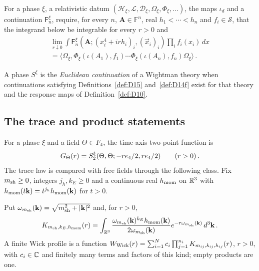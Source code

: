 \begin{definition}\label{def:D14f}
For a phase $\xi$, a relativistic datum $(\mathcal H_\xi,\mathcal L,\mathcal D_\xi,\Omega_\xi,\Phi_\xi,\ldots)$, the maps $\iota_d$ and a continuation $\mathsf F_n^\xi$, require, for every $n$, $\boldsymbol A\in\mathbb F^n$, real $h_1<\cdots<h_n$ and $f_i\in\mathcal S$, that the integrand below be integrable for every $r>0$ and
\begin{multline*}
\lim_{r\downarrow0}\int\mathsf F_n^\xi(\boldsymbol A;(x_i^4+irh_i)_i,(\vec x_i)_i)\prod_i f_i(x_i)\,dx\\
=\langle\Omega_\xi,\Phi_\xi(\iota(A_1),f_1)\cdots\Phi_\xi(\iota(A_n),f_n)\Omega_\xi\rangle\,.
\end{multline*}
\end{definition}

A phase $S^\xi$ is the \emph{Euclidean continuation} of a Wightman theory when continuations satisfying Definitions~\ref{def:D15} and~\ref{def:D14f} exist for that theory and the response maps of Definition~\ref{def:D10}.

\subsection{The trace and product statements}\label{sec:short-distance-defs}

For a phase $\xi$ and a field $\Theta\in F_4$, the time-axis two-point function is
\begin{equation*}
G_{\Theta}(r)=S_2^{\xi}(\Theta,\Theta;-re_4/2,re_4/2)\qquad(r>0)\,.
\end{equation*}
The trace law is compared with free fields through the following class. Fix $m_{\rm sh}\ge0$, integers $j_h,k_E\ge0$ and a continuous real $h_{\rm mom}$ on $\mathbb{R}^3$ with $h_{\rm mom}(t\mathbf k)=t^{j_h}h_{\rm mom}(\mathbf k)$ for $t>0$.

\begin{definition}\label{def:D17}
Put $\omega_{m_{\rm sh}}(\mathbf k)=\sqrt{m_{\rm sh}^2+|\mathbf k|^2}$ and, for $r>0$,
\begin{equation*}
K_{m_{\rm sh},k_E,h_{\rm mom}}(r)=\int_{\mathbb{R}^3}\frac{\omega_{m_{\rm sh}}(\mathbf k)^{k_E}h_{\rm mom}(\mathbf k)}{2\omega_{m_{\rm sh}}(\mathbf k)}e^{-r\omega_{m_{\rm sh}}(\mathbf k)}\,d^3\mathbf k\,.
\end{equation*}
A finite Wick profile is a function $W_{\rm Wick}(r)=\sum_{i=1}^{N}c_i\prod_{j=1}^{n_i}K_{m_{ij},k_{ij},h_{ij}}(r)$, $r>0$, with $c_i\in\mathbb{C}$ and finitely many terms and factors of this kind; empty products are one.
\end{definition}

